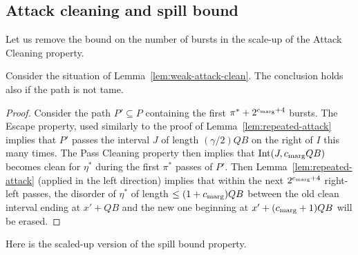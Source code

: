 \documentclass[11pt]{memoir}
\theoremstyle{definition} %
\renewcommand{\le}{\leq}
\def\B{B}
\newcommand{\Int}{\mathrm{Int}} %
\newcommand{\passno}{\pi}
\newcommand{\Q}{Q} %
\newcommand{\cns}[1]{c_{\textrm{\upshape #1}}}
\newcommand{\CMarg}{\cns{marg}}
\begin{document}
\subsection{Attack cleaning and spill bound}

Let us remove the bound on the number of bursts in the scale-up of the Attack Cleaning property.

\begin{lemma}\label{lem:attack-clean}
  Consider the situation of Lemma~\ref{lem:weak-attack-clean}.
  The conclusion holds also if the path is not tame.
\end{lemma}
\begin{proof}
  Consider the path \( P'\subseteq P \) containing the first \( \passno^{*}+2^{\CMarg+4} \) bursts.
  The Escape property, used similarly to the proof of Lemma~\ref{lem:repeated-attack}
  implies that \( P' \) passes the
  interval \( J \) of length \( (\gamma/2)\Q\B \) on the right of \( I \) this many times.
  The Pass Cleaning property then implies that \( \Int(J,\CMarg\Q\B) \) becomes
  clean for \( \eta^{*} \) during the first \( \passno^{*} \) passes of \( P' \).
  Then Lemma~\ref{lem:repeated-attack} (applied in the left direction)
  implies that within the next \( 2^{\CMarg+4} \) right-left passes,
  the disorder of \( \eta^{*} \) of length \( \le (1+\CMarg)\Q\B \) between the old clean interval
  ending at \( x'+\Q\B \) and the new one beginning at \( x'+(\CMarg+1)\Q\B \) will be erased.
    \end{proof}

Here is the scaled-up version of the spill bound property.
\end{document}
